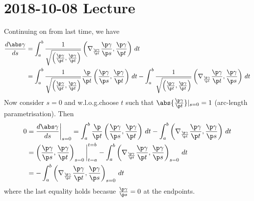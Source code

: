 \section{2018-10-08 Lecture}

Continuing on from last time, we have
\begin{align*}
  \frac{d\abs\gamma}{ds} &= \int_a^b \frac{1}{\sqrt{\left( \frac{\p\gamma}{\p t},\frac{\p\gamma}{\p t} \right)}} \left( \nabla_{\frac{\p\gamma}{\p t}} \frac{\p\gamma}{\p s}, \frac{\p\gamma}{\p t} \right) \, dt \\
  &= \int_a^b \frac{1}{\sqrt{\left( \frac{\p\gamma}{\p t},\frac{\p\gamma}{\p t} \right)}} \frac{\p}{\p t} \left( \frac{\p\gamma}{\p s}, \frac{\p\gamma}{\p t} \right) \, dt - \int_a^b \frac{1}{\sqrt{\left( \frac{\p\gamma}{\p t},\frac{\p\gamma}{\p t} \right)}} \left( \nabla_{\frac{\p\gamma}{\p t}} \frac{\p\gamma}{\p t}, \frac{\p\gamma}{\p s} \right) \, dt
\end{align*}
Now consider $s=0$ and w.l.o.g.\@ choose $t$ such that $\abs{\tfrac{\p\gamma}{\p t}}|_{s=0}=1$ (arc-length parametrisation).
Then
\begin{align*}
  0 &= \frac{d\abs\gamma}{ds}\bigg\vert_{s=0} = \int_a^b \frac{\p}{\p t} \left( \frac{\p\gamma}{\p s}, \frac{\p\gamma}{\p t} \right) \, dt - \int_a^b \left( \nabla_{\frac{\p\gamma}{\p t}} \frac{\p\gamma}{\p t}, \frac{\p\gamma}{\p s} \right) \, dt \\
  &= \left( \frac{\p\gamma}{\p s}, \frac{\p\gamma}{\p t} \right)_{s=0} \bigg\vert^{t=b}_{t=a} - \int_a^b \left( \nabla_{\frac{\p\gamma}{\p t}} \frac{\p\gamma}{\p t}, \frac{\p\gamma}{\p s} \right)_{s=0} \, dt \\
  &= - \int_a^b \left( \nabla_{\frac{\p\gamma}{\p t}} \frac{\p\gamma}{\p t}, \frac{\p\gamma}{\p s} \right)_{s=0} \, dt
\end{align*}
where the last equality holds becasue $\tfrac{\p\gamma}{\p s}=0$ at the endpoints.

